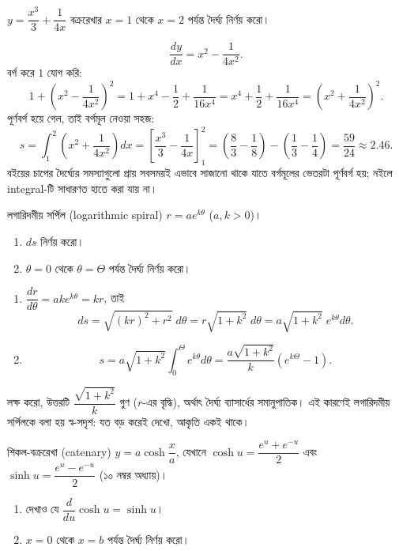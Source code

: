 \documentclass[11pt]{article}
\begin{document}
 $y = \dfrac{x^{3}}{3} + \dfrac{1}{4x}$ বক্ররেখার $x=1$ থেকে $x=2$
পর্যন্ত দৈর্ঘ্য নির্ণয় করো।

\begin{sol}
\[
  \frac{dy}{dx} = x^{2} - \frac{1}{4x^{2}} .
\]
বর্গ করে $1$ যোগ করি:
\[
  1 + \left( x^{2} - \frac{1}{4x^{2}} \right)^{2}
  = 1 + x^{4} - \frac{1}{2} + \frac{1}{16x^{4}}
  = x^{4} + \frac{1}{2} + \frac{1}{16x^{4}}
  = \left( x^{2} + \frac{1}{4x^{2}} \right)^{2} .
\]
পূর্ণবর্গ হয়ে গেল, তাই বর্গমূল নেওয়া সহজ:
\[
  s = \int_{1}^{2}\left( x^{2} + \frac{1}{4x^{2}} \right)dx
    = \left[ \frac{x^{3}}{3} - \frac{1}{4x} \right]_{1}^{2}
    = \left( \frac{8}{3} - \frac{1}{8} \right)
      - \left( \frac{1}{3} - \frac{1}{4} \right)
    = \frac{59}{24} \approx 2.46 .
\]
বইয়ের চাপের দৈর্ঘ্যের সমস্যাগুলো প্রায় সবসময়ই এভাবে সাজানো থাকে যাতে
বর্গমূলের ভেতরটা পূর্ণবর্গ হয়; নইলে integral-টি সাধারণত হাতে করা যায় না।
\end{sol}

 লগারিদমীয় সর্পিল (logarithmic spiral) $r = a e^{k\theta}$ ($a, k > 0$)।
\begin{enumerate}
  \item $ds$ নির্ণয় করো।
  \item $\theta = 0$ থেকে $\theta = \Theta$ পর্যন্ত দৈর্ঘ্য নির্ণয় করো।
\end{enumerate}

\begin{sol}
\begin{enumerate}
  \item $\dfrac{dr}{d\theta} = ake^{k\theta} = kr$, তাই
        \[
          ds = \sqrt{(kr)^{2} + r^{2}}\;d\theta
             = r\sqrt{1+k^{2}}\;d\theta
             = a\sqrt{1+k^{2}}\;e^{k\theta}d\theta .
        \]
  \item \[
          s = a\sqrt{1+k^{2}}\int_{0}^{\Theta}e^{k\theta}d\theta
            = \frac{a\sqrt{1+k^{2}}}{k}\left( e^{k\Theta} - 1 \right) .
        \]
\end{enumerate}
লক্ষ করো, উত্তরটি $\dfrac{\sqrt{1+k^{2}}}{k}$ গুণ ($r$-এর বৃদ্ধি), অর্থাৎ
দৈর্ঘ্য ব্যাসার্ধের সমানুপাতিক। এই কারণেই লগারিদমীয় সর্পিলকে বলা হয়
স্ব-সদৃশ: যত বড় করেই দেখো, আকৃতি একই থাকে।
\end{sol}

 শিকল-বক্ররেখা (catenary) $y = a\cosh\dfrac{x}{a}$, যেখানে
$\cosh u = \dfrac{e^{u}+e^{-u}}{2}$ এবং $\sinh u = \dfrac{e^{u}-e^{-u}}{2}$
(১০ নম্বর অধ্যায়)।
\begin{enumerate}
  \item দেখাও যে $\dfrac{d}{du}\cosh u = \sinh u$।
  \item $x = 0$ থেকে $x = b$ পর্যন্ত দৈর্ঘ্য নির্ণয় করো।
\end{enumerate}
\end{document}
